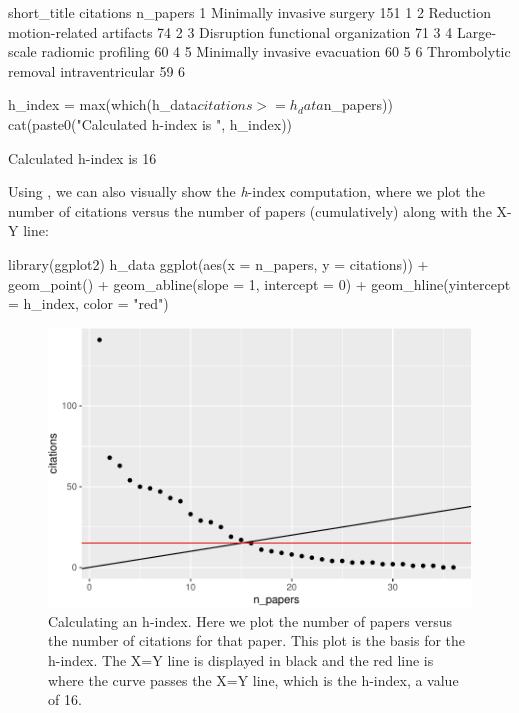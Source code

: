 \begin{Schunk}
\begin{Soutput}
                            short_title citations n_papers
1            Minimally invasive surgery       151        1
2    Reduction motion-related artifacts        74        2
3    Disruption functional organization        71        3
4        Large-scale radiomic profiling        60        4
5         Minimally invasive evacuation        60        5
6 Thrombolytic removal intraventricular        59        6
\end{Soutput}
\begin{Sinput}
h_index = max(which(h_data$citations >= h_data$n_papers))
cat(paste0("Calculated h-index is ", h_index))
\end{Sinput}
\begin{Soutput}
Calculated h-index is 16
\end{Soutput}
\end{Schunk}

Using  \citep{ggplot2}, we can also visually show the
\emph{h}-index computation, where we plot the number of citations versus
the number of papers (cumulatively) along with the X-Y line:

\begin{Schunk}
\begin{Sinput}
library(ggplot2)
h_data %
  ggplot(aes(x = n_papers, y = citations)) + 
  geom_point() + geom_abline(slope = 1, intercept = 0) + 
  geom_hline(yintercept = h_index, color = "red")
\end{Sinput}
\begin{figure}
\includegraphics{muschelli_files/figure-latex/unnamed-chunk-14-1} \caption[Calculating an h-index]{Calculating an h-index.  Here we plot the number of papers versus the number of citations for that paper.  This plot is the basis for the h-index.  The X=Y line is displayed in black and the red line is where the curve passes the X=Y line, which is the h-index, a value of 16.}\label{fig:unnamed-chunk-14}
\end{figure}
\end{Schunk}

